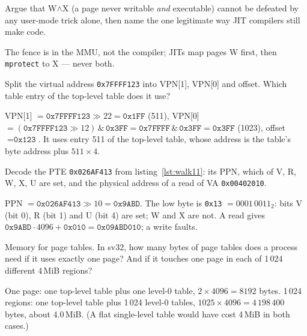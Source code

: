 \begin{exercise}[hard]
Argue that W$\wedge$X (a page never writable \emph{and} executable)
cannot be defeated by any user-mode trick alone, then name the one
legitimate way JIT compilers still make code.
\end{exercise}
\begin{solution}[hint]
The fence is in the MMU, not the compiler; JITs map pages W first,
then \texttt{mprotect} to X --- never both.
\end{solution}

\begin{exercise}[easy]
Split the virtual address \texttt{0x7FFFF123} into VPN[1], VPN[0] and
offset. Which table entry of the top-level table does it use?
\end{exercise}
\begin{solution}[hint]
VPN[1] $=\texttt{0x7FFFF123}\gg22=\texttt{0x1FF}$ (511), VPN[0]
$=(\texttt{0x7FFFF123}\gg12)\,\&\,\texttt{0x3FF}=\texttt{0x7FFFF}\,\&\,\texttt{0x3FF}=\texttt{0x3FF}$ (1023),
offset $=\texttt{0x123}$. It uses entry 511 of the top-level table, whose
address is the table's byte address plus $511\times4$.
\end{solution}

\begin{exercise}[medium]
Decode the PTE \texttt{0x026AF413} from listing~\ref{lst:walk11}: its PPN,
which of V, R, W, X, U are set, and the physical address of a read of
VA \texttt{0x00402010}.
\end{exercise}
\begin{solution}[hint]
PPN $=\texttt{0x026AF413}\gg10=\texttt{0x9ABD}$. The low byte is
\texttt{0x13} $=0001\,0011_2$: bits V (bit 0), R (bit 1) and U (bit 4)
are set; W and X are not. A read gives $\texttt{0x9ABD}\cdot4096+\texttt{0x010}=\texttt{0x09ABD010}$;
a write faults.
\end{solution}

\begin{exercise}[medium]
Memory for page tables. In sv32, how many bytes of page tables does a
process need if it uses exactly one page? And if it touches one page in
each of 1\,024 different 4\,MiB regions?
\end{exercise}
\begin{solution}[hint]
One page: one top-level table plus one level-0 table, $2\times4096=8192$
bytes. 1\,024 regions: one top-level table plus 1\,024 level-0 tables,
$1025\times4096=4\,198\,400$ bytes, about 4.0\,MiB. (A flat single-level
table would have cost 4\,MiB in both cases.)
\end{solution}

